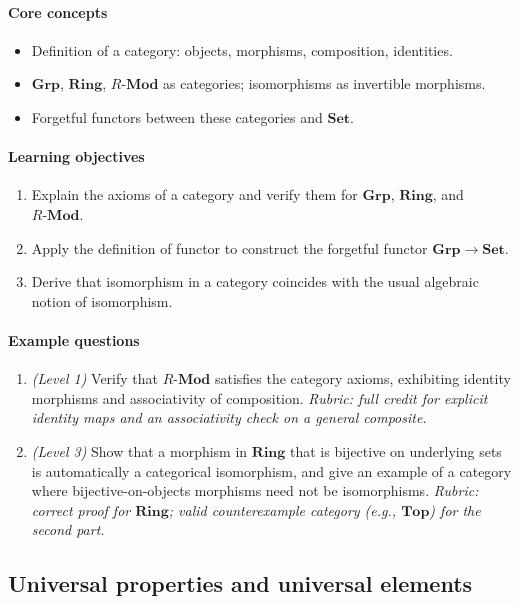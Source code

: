 \documentclass{article}
\begin{document}
\paragraph{Core concepts}
\begin{itemize}[nosep]
  \item Definition of a category: objects, morphisms, composition, identities.
  \item $\mathbf{Grp}$, $\mathbf{Ring}$, $R\text{-}\mathbf{Mod}$ as categories; isomorphisms as invertible morphisms.
  \item Forgetful functors between these categories and $\mathbf{Set}$.
\end{itemize}
\paragraph{Learning objectives}
\begin{enumerate}[nosep]
  \item Explain the axioms of a category and verify them for $\mathbf{Grp}$, $\mathbf{Ring}$, and $R\text{-}\mathbf{Mod}$.
  \item Apply the definition of functor to construct the forgetful functor $\mathbf{Grp}\to\mathbf{Set}$.
  \item Derive that isomorphism in a category coincides with the usual algebraic notion of isomorphism.
\end{enumerate}
\paragraph{Example questions}
\begin{enumerate}[nosep]
  \item \emph{(Level 1)} Verify that $R\text{-}\mathbf{Mod}$ satisfies the category axioms, exhibiting identity morphisms and associativity of composition. \emph{Rubric: full credit for explicit identity maps and an associativity check on a general composite.}
  \item \emph{(Level 3)} Show that a morphism in $\mathbf{Ring}$ that is bijective on underlying sets is automatically a categorical isomorphism, and give an example of a category where bijective-on-objects morphisms need not be isomorphisms. \emph{Rubric: correct proof for $\mathbf{Ring}$; valid counterexample category (e.g., $\mathbf{Top}$) for the second part.}
\end{enumerate}

\subsection{Universal properties and universal elements}
\end{document}
